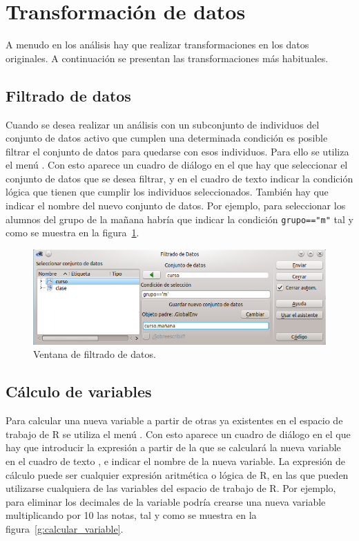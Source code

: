 \section{Transformación de datos}
A menudo en los análisis hay que realizar transformaciones en los datos originales.
A continuación se presentan las transformaciones más habituales.


\subsection{Filtrado de datos}
Cuando se desea realizar un análisis con un subconjunto de individuos del conjunto de datos activo que cumplen una
determinada condición es posible filtrar el conjunto de datos para quedarse con esos individuos.
Para ello se utiliza el menú .
Con esto aparece un cuadro de diálogo en el que hay que seleccionar el conjunto de datos que se desea filtrar, y en el
cuadro de texto  indicar la condición lógica que tienen que cumplir los individuos
seleccionados.
También hay que indicar el nombre del nuevo conjunto de datos.
Por ejemplo, para seleccionar los alumnos del grupo de la mañana habría que indicar la condición
\lstinline{grupo=="m"} tal y como se muestra en la figura~\ref{g:filtrar_datos}.

\begin{figure}[htp]
\begin{center}
  \includegraphics[scale=0.6]{capitulos/introduccion/img/filtrar}
  \caption{Ventana de filtrado de datos.}
  \label{g:filtrar_datos}
\end{center}
\end{figure}


\subsection{Cálculo de variables}
Para calcular una nueva variable a partir de otras ya existentes en el espacio de trabajo de R se utiliza el menú
.
Con esto aparece un cuadro de diálogo en el que hay que introducir la expresión a partir de la que se calculará la nueva
variable en el cuadro de texto , e indicar el nombre de la nueva variable.
La expresión de cálculo puede ser cualquier expresión aritmética o lógica de R, en las que pueden utilizarse cualquiera
de las variables del espacio de trabajo de R. Por ejemplo, para eliminar los decimales de la variable 
podría crearse una nueva variable  multiplicando por 10 las notas, tal y como se muestra en la
figura~\ref{g:calcular_variable}.

